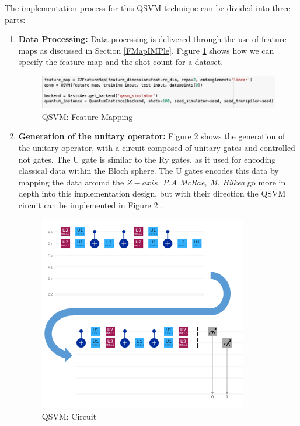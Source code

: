 The implementation process for this QSVM technique can be divided into three parts: 
\begin{enumerate}
    
\item  \textbf{Data Processing:} Data processing is delivered through the use of feature maps as discussed in Section \ref{FMapIMPle}. Figure \ref{SVMFMap} shows how we can specify the feature map and the shot count for a dataset.


\begin{figure}[H]
      \centering
      \includegraphics[scale=0.6]{background/fMapSVM.png}
      \caption{QSVM: Feature Mapping}
      \label{SVMFMap}
\end{figure}



\item \textbf{Generation of the unitary operator:} Figure \ref{SVMCir} shows the generation of the unitary operator, with a circuit composed of unitary gates and controlled not gates. The U gate is similar to the Ry gates, as it used for encoding classical data within the Bloch sphere. The U gates encodes this data by mapping the data around the $Z-axis$. \emph{P.A McRae, M. Hilkea} \citep{mcrae2020} go more in depth into this implementation design, but with their direction the QSVM circuit can be implemented in Figure \ref{SVMCir} .

\begin{figure}[H]
      \centering
      \includegraphics[scale=0.8]{background/SVMCir.png}
      \caption{QSVM: Circuit \cite{mcrae2020}}
      \label{SVMCir}
\end{figure}


\end{enumerate}
